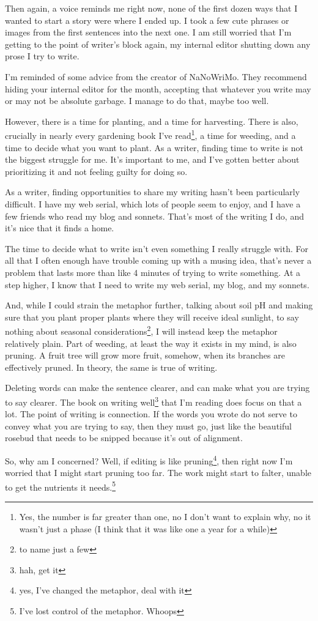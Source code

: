 \documentclass[12pt]{article}[titlepage]
\newcommand{\1}{\={a}}
\newcommand{\2}{\={e}}
\newcommand{\3}{\={\i}}
\newcommand{\4}{\=o}
\newcommand{\5}{\=u}
\newcommand{\6}{\={A}}
\renewcommand{\,}{\textsuperscript{,}}
\begin{document}
Then again, a voice reminds me right now, none of the first dozen ways that I wanted to start a story were where I ended up.
I took a few cute phrases or images from the first sentences into the next one.
I am still worried that I'm getting to the point of writer's block again, my internal editor shutting down any prose I try to write.

I'm reminded of some advice from the creator of NaNoWriMo.
They recommend hiding your internal editor for the month, accepting that whatever you write may or may not be absolute garbage.
I manage to do that, maybe too well.

However, there is a time for planting, and a time for harvesting.
There is also, crucially in nearly every gardening book I've read\footnote{Yes, the number is far greater than one, no I don't want to explain why, no it wasn't just a phase (I think that it was like one a year for a while)}, a time for weeding, and a time to decide what you want to plant.
As a writer, finding time to write is not the biggest struggle for me.
It's important to me, and I've gotten better about prioritizing it and not feeling guilty for doing so.

As a writer, finding opportunities to share my writing hasn't been particularly difficult.
I have my web serial, which lots of people seem to enjoy, and I have a few friends who read my blog and sonnets.
That's most of the writing I do, and it's nice that it finds a home.

The time to decide what to write isn't even something I really struggle with.
For all that I often enough have trouble coming up with a musing idea, that's never a problem that lasts more than like 4 minutes of trying to write something.
At a step higher, I know that I need to write my web serial, my blog, and my sonnets.

And, while I could strain the metaphor further, talking about soil pH and making sure that you plant proper plants where they will receive ideal sunlight, to say nothing about seasonal considerations\footnote{to name just a few}, I will instead keep the metaphor relatively plain.
Part of weeding, at least the way it exists in my mind, is also pruning.
A fruit tree will grow more fruit, somehow, when its branches are effectively pruned.
In theory, the same is true of writing.

Deleting words can make the sentence clearer, and can make what you are trying to say clearer.
The book on writing well\footnote{hah, get it} that I'm reading does focus on that a lot.
The point of writing is connection.
If the words you wrote do not serve to convey what you are trying to say, then they must go, just like the beautiful rosebud that needs to be snipped because it's out of alignment.

So, why am I concerned?
Well, if editing is like pruning\footnote{yes, I've changed the metaphor, deal with it}, then right now I'm worried that I might start pruning too far.
The work might start to falter, unable to get the nutrients it needs.\footnote{I've lost control of the metaphor. Whoops}
\end{document}

